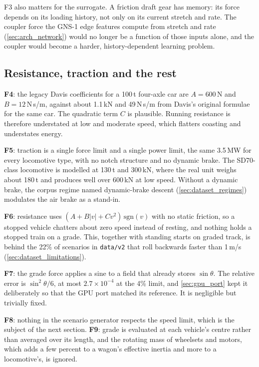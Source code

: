 F3 also matters for the surrogate. A friction draft gear has memory: its force depends on its loading history, not only on its current stretch and rate. The coupler force the GNS-1 edge features compute from stretch and rate (\cref{sec:arch_network}) would no longer be a function of those inputs alone, and the coupler would become a harder, history-dependent learning problem.

\subsection{Resistance, traction and the rest}

\textbf{F4}: the legacy Davis coefficients for a 100\,t four-axle car are $A = 600$\,N and $B = 12$\,N\,s/m, against about 1.1\,kN and 49\,N\,s/m from Davis's original formulae for the same car. %
The quadratic term $C$ is plausible. Running resistance is therefore understated at low and moderate speed, which flatters coasting and understates energy.

\textbf{F5}: traction is a single force limit and a single power limit, the same 3.5\,MW for every locomotive type, with no notch structure and no dynamic brake. The SD70-class locomotive is modelled at 130\,t and 300\,kN, where the real unit weighs about 180\,t and produces well over 600\,kN at low speed. Without a dynamic brake, the corpus regime named dynamic-brake descent (\cref{sec:dataset_regimes}) modulates the air brake as a stand-in.

\textbf{F6}: resistance uses $(A + B|v| + Cv^2)\,\mathrm{sgn}(v)$ with no static friction, so a stopped vehicle chatters about zero speed instead of resting, and nothing holds a stopped train on a grade. This, together with standing starts on graded track, is behind the 22\% of scenarios in \texttt{data/v2} that roll backwards faster than 1\,m/s (\cref{sec:dataset_limitations}).

\textbf{F7}: the grade force applies a sine to a field that already stores $\sin\theta$. The relative error is $\sin^2\theta/6$, at most $2.7\times10^{-4}$ at the 4\% limit, and \cref{sec:gpu_port} kept it deliberately so that the GPU port matched its reference. It is negligible but trivially fixed.

\textbf{F8}: nothing in the scenario generator respects the speed limit, which is the subject of the next section. \textbf{F9}: grade is evaluated at each vehicle's centre rather than averaged over its length, and the rotating mass of wheelsets and motors, which adds a few percent to a wagon's effective inertia and more to a locomotive's, is ignored.

